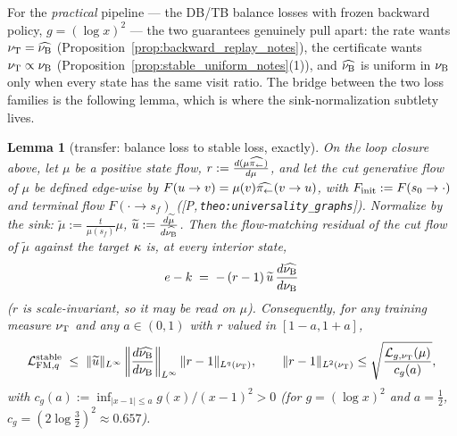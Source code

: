 \documentclass[11pt]{article}
\newtheorem{lemma}[theorem]{Lemma}
\theoremstyle{definition}
\theoremstyle{remark}
\def\lambda{\widehat\nuB}
\newcommand{\paperref}[1]{[P,\,\texttt{#1}]}   %
\begin{document}
For the \emph{practical} pipeline --- the DB/TB balance losses with frozen backward
policy, $g=(\log x)^2$ --- the two guarantees genuinely pull apart: the rate wants
$\nutrain=\lambda$ (Proposition~\ref{prop:backward_replay_notes}), the certificate wants
$\nu_{\mathrm{T}}\propto\nu_{\mathrm{B}}$ (Proposition~\ref{prop:stable_uniform_notes}(1)), and $\lambda$ is
uniform in $\nu_{\mathrm{B}}$ only when every state has the same visit ratio. The bridge between
the two loss families is the following lemma, which is where the sink-normalization
subtlety lives.

\begin{lemma}[transfer: balance loss to stable loss, exactly]\label{lem:transfer_notes}
On the loop closure above, let $\mu$ be a positive state flow, $r:=\frac{d(\mu\widehat{\pi_{\leftarrow}})}{d\mu}$,
and let the cut generative flow of $\mu$ be defined edge-wise by
$F(u\rightarrow v)=\mu(v)\widehat{\pi_{\leftarrow}}(v\rightarrow u)$, with
$F_{\mathrm{init}}:=F(s_0\rightarrow\cdot)$ and terminal flow $F(\cdot\rightarrow s_f)$
(\paperref{theo:universality\_graphs}). Normalize by the sink:
$\widetilde\mu:=\frac{t}{\mu(s_f)}\mu$, $\widetilde u:=\frac{d\widetilde\mu}{d\lambda}$.
Then the flow-matching residual of the cut flow of $\widetilde\mu$ against the target
$\kappa$ is, at every interior state,
\begin{equation}\label{equ:transfer_identity_notes}
    e-k \;=\; -\,(r-1)\,\widetilde u\,\frac{d\lambda}{d\nuB}
\end{equation}
($r$ is scale-invariant, so it may be read on $\mu$). Consequently, for any training
measure $\nu_{\mathrm{T}}$ and any $a\in(0,1)$ with $r$ valued in $[1-a,1+a]$,
\begin{equation}\label{equ:transfer_bound_notes}
    \LFMstableq\;\leq\;\|\widetilde u\|_{L^\infty}
    \left\|\frac{d\lambda}{d\nuB}\right\|_{L^\infty}\|r-1\|_{L^q(\nutrain)},
    \qquad
    \|r-1\|_{L^2(\nutrain)}\leq\sqrt{\frac{\mathcal L_{g,\nutrain}(\mu)}{c_g(a)}},
\end{equation}
with $c_g(a):=\inf_{|x-1|\leq a}g(x)/(x-1)^2>0$ (for $g=(\log x)^2$ and $a=\frac12$,
$c_g=(2\log\frac32)^2\approx0.657$).
\end{lemma}
\end{document}

